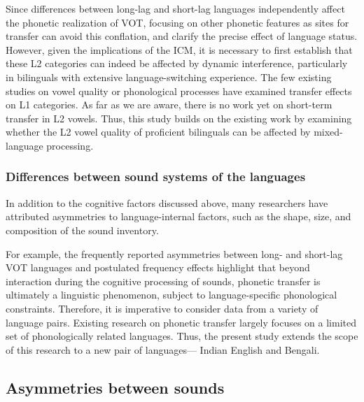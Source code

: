 \documentclass[12 pt]{article}
\begin{document}
Since differences between long-lag and short-lag languages independently affect the phonetic realization of VOT, focusing on other phonetic features as sites for transfer can avoid this conflation, and clarify the precise effect of language status. However, given the implications of the ICM, it is necessary to first establish that these L2 categories can indeed be affected by dynamic interference, particularly in bilinguals with extensive language-switching experience. The few existing studies on vowel quality \citep{simonet2014phonetic,muldner2019phonetics,elias2017effects} or phonological processes \citep{simonet2020increased,schwartz2015language} have examined transfer effects on L1 categories. As far as we are aware, there is no work yet on short-term transfer in L2 vowels. Thus, this study builds on the existing work by examining whether the L2 vowel quality of proficient bilinguals can be affected by mixed-language processing.

\subsubsection*{Differences between sound systems of the languages} \label{sound systems} In addition to the cognitive factors discussed above, many researchers have attributed asymmetries to language-internal factors, such as the shape, size, and composition of the sound inventory.
 
For example, the frequently reported asymmetries between long- and short-lag VOT languages \citep[see, e.g.][]{tobin2017phonetic, olson2016role,bullock2009trying,antoniou2011inter,chang2012rapid} and postulated frequency effects \citep{antoniou2011inter} highlight that beyond interaction during the cognitive processing of sounds, phonetic transfer is ultimately a linguistic phenomenon, subject to language-specific phonological constraints. Therefore, it is imperative to consider data from a variety of language pairs. Existing research on phonetic transfer largely focuses on a limited set of phonologically related languages. Thus, the present study extends the scope of this research to a new pair of languages--- Indian English and Bengali.


\subsection{Asymmetries between sounds}\label{asymmetry between sounds}
\end{document}
